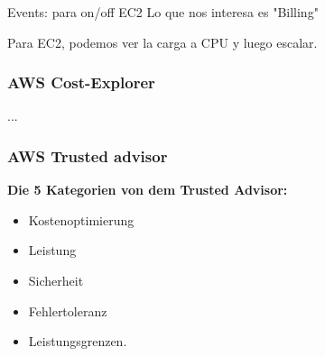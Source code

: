 
Events: para on/off EC2
Lo que nos interesa es "Billing"

Para EC2, podemos ver la carga a CPU y luego escalar.




\subsubsection{AWS Cost-Explorer}
...

\subsubsection{AWS Trusted advisor}

\textbf{Die 5 Kategorien von dem Trusted Advisor:}

\begin{itemize}
  \item
        Kostenoptimierung

  \item
        Leistung
  \item
        Sicherheit
  \item
        Fehlertoleranz
  \item
        Leistungsgrenzen.
\end{itemize}\textbf{}




